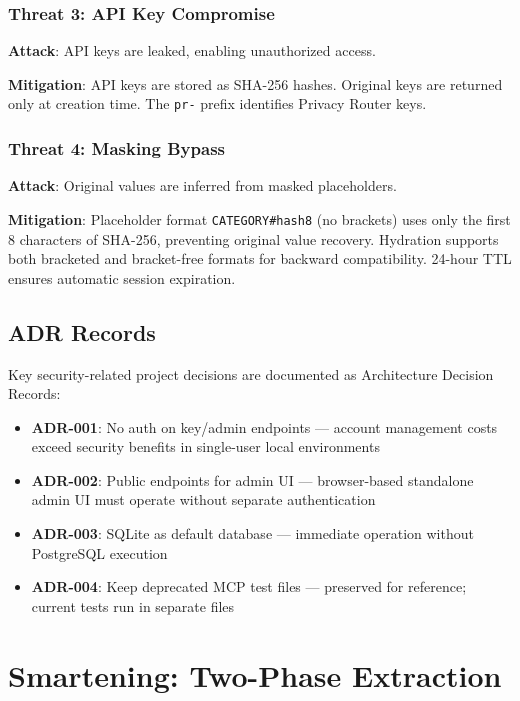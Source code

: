 \documentclass[11pt,a4paper]{article}
\begin{document}
\subsubsection{Threat 3: API Key Compromise}

\textbf{Attack}: API keys are leaked, enabling unauthorized access.

\textbf{Mitigation}: API keys are stored as SHA-256 hashes. Original keys are returned only at creation time. The \texttt{pr-} prefix identifies Privacy Router keys.

\subsubsection{Threat 4: Masking Bypass}

\textbf{Attack}: Original values are inferred from masked placeholders.

\textbf{Mitigation}: Placeholder format \texttt{CATEGORY\#hash8} (no brackets) uses only the first 8 characters of SHA-256, preventing original value recovery. Hydration supports both bracketed and bracket-free formats for backward compatibility. 24-hour TTL ensures automatic session expiration.

\subsection{ADR Records}

Key security-related project decisions are documented as Architecture Decision Records:

\begin{itemize}[nosep]
  \item \textbf{ADR-001}: No auth on key/admin endpoints --- account management costs exceed security benefits in single-user local environments
  \item \textbf{ADR-002}: Public endpoints for admin UI --- browser-based standalone admin UI must operate without separate authentication
  \item \textbf{ADR-003}: SQLite as default database --- immediate operation without PostgreSQL execution
  \item \textbf{ADR-004}: Keep deprecated MCP test files --- preserved for reference; current tests run in separate files
\end{itemize}

\section{Smartening: Two-Phase Extraction}
\end{document}
